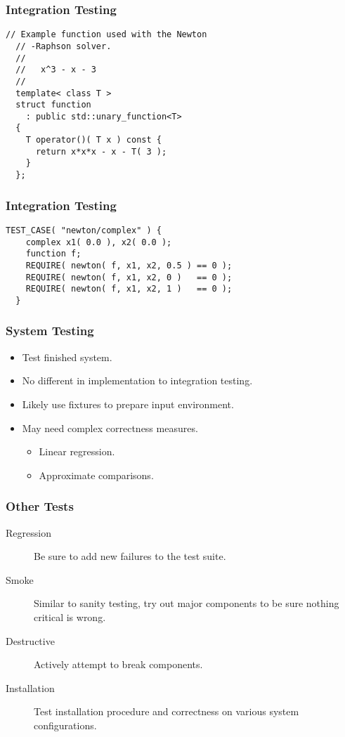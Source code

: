 \begin{frame}[fragile]
  \frametitle{Integration Testing}
  \begin{example}
    \begin{lstlisting}[style=C]
  // Example function used with the Newton
  // -Raphson solver.
  //
  //   x^3 - x - 3
  //
  template< class T >
  struct function
    : public std::unary_function<T>
  {
    T operator()( T x ) const {
      return x*x*x - x - T( 3 );
    }
  };
    \end{lstlisting}
  \end{example}
\end{frame}

\begin{frame}[fragile]
  \frametitle{Integration Testing}
  \begin{example}
    \begin{lstlisting}[style=C]
  TEST_CASE( "newton/complex" ) {
    complex x1( 0.0 ), x2( 0.0 );
    function f;
    REQUIRE( newton( f, x1, x2, 0.5 ) == 0 );
    REQUIRE( newton( f, x1, x2, 0 )   == 0 );
    REQUIRE( newton( f, x1, x2, 1 )   == 0 );
  }
    \end{lstlisting}
  \end{example}
\end{frame}

\begin{frame}
  \frametitle{System Testing}
  \begin{itemize}
  \item Test finished system.
  \vspace{0.3cm}
  \item No different in implementation to integration testing.
  \vspace{0.3cm}
  \item Likely use fixtures to prepare input environment.
  \vspace{0.3cm}
  \item May need complex correctness measures.
    \begin{itemize}
    \item Linear regression.
    \item Approximate comparisons.
    \end{itemize}
  \end{itemize}
\end{frame}

\begin{frame}
  \frametitle{Other Tests}
  \begin{description}
  \item[Regression] Be sure to add new failures to the test suite.
  \item[Smoke] Similar to sanity testing, try out major components to be sure nothing critical is wrong.
  \item[Destructive] Actively attempt to break components.
  \item[Installation] Test installation procedure and correctness on various system configurations.
  \end{description}
\end{frame}
